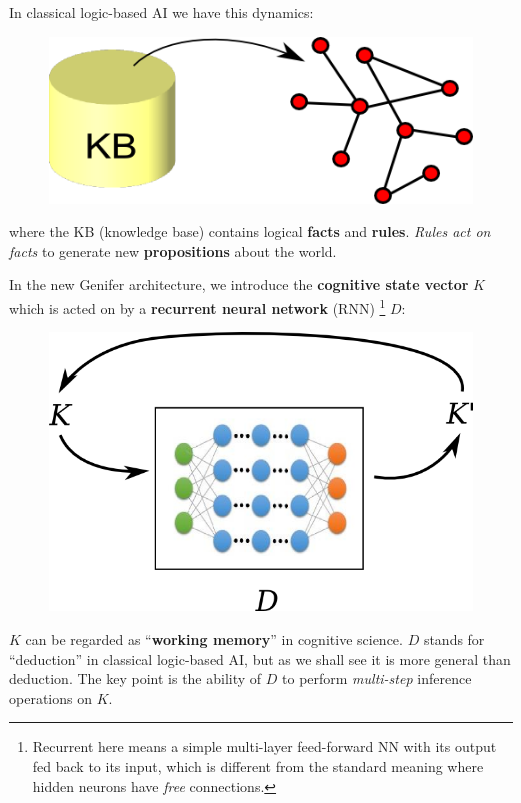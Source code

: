 \documentclass[12pt]{article}
\begin{document}
In classical logic-based AI we have this dynamics:
\begin{figure}[H]
\centering
\includegraphics[scale=0.5]{classical-LBAI.png}
\end{figure}
where the KB (knowledge base) contains logical \textbf{facts} and \textbf{rules}.  \textit{Rules act on facts} to generate new \textbf{propositions} about the world.

In the new Genifer architecture, we introduce the \textbf{cognitive state vector} $K$ which is acted on by a \textbf{recurrent neural network} (RNN) \footnote{Recurrent here means a simple multi-layer feed-forward NN with its output fed back to its input, which is different from the standard meaning where hidden neurons have \textit{free} connections.} $D$:
\begin{figure}[H]
\centering
\includegraphics[scale=0.75]{reasoner-model.png}
\end{figure}
$K$ can be regarded as ``\textbf{working memory}'' in cognitive science.  $D$ stands for ``deduction'' in classical logic-based AI, but as we shall see it is more general than deduction.  The key point is the ability of $D$ to perform \textit{multi-step} inference operations on $K$.
\end{document}
